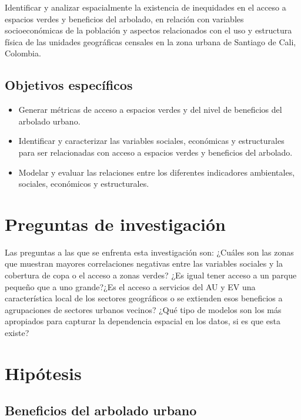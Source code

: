 \documentclass[12pt,a4paper,oneside, openany]{book}
\providecommand{\tightlist}{%
  \setlength{\itemsep}{0pt}\setlength{\parskip}{0pt}}
\theoremstyle{definition}
\theoremstyle{definition}
\theoremstyle{definition}
\theoremstyle{remark}
\begin{document}
Identificar y analizar espacialmente la existencia de inequidades en el
acceso a espacios verdes y beneficios del arbolado, en relación con
variables socioeconómicas de la población y aspectos relacionados con el
uso y estructura física de las unidades geográficas censales en la zona
urbana de Santiago de Cali, Colombia.

\subsection{Objetivos específicos}\label{objetivos-especuxedficos}

\begin{itemize}
\tightlist
\item
  Generar métricas de acceso a espacios verdes y del nivel de beneficios
  del arbolado urbano.
\item
  Identificar y caracterizar las variables sociales, económicas y
  estructurales para ser relacionadas con acceso a espacios verdes y
  beneficios del arbolado.
\item
  Modelar y evaluar las relaciones entre los diferentes indicadores
  ambientales, sociales, económicos y estructurales.
\end{itemize}

\section{Preguntas de
investigación}\label{preguntas-de-investigaciuxf3n}

Las preguntas a las que se enfrenta esta investigación son: ¿Cuáles son
las zonas que muestran mayores correlaciones negativas entre las
variables sociales y la cobertura de copa o el acceso a zonas verdes?
¿Es igual tener acceso a un parque pequeño que a uno grande?¿Es el
acceso a servicios del AU y EV una característica local de los sectores
geográficos o se extienden esos beneficios a agrupaciones de sectores
urbanos vecinos? ¿Qué tipo de modelos son los más apropiados para
capturar la dependencia espacial en los datos, si es que esta existe?

\section{Hipótesis}\label{hipuxf3tesis}

\subsection{Beneficios del arbolado
urbano}\label{beneficios-del-arbolado-urbano}
\end{document}
